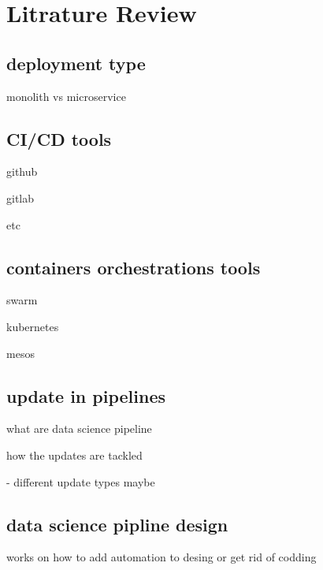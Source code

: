 \section{Litrature Review}
\label{sec:review}
\subsection{deployment type}
monolith vs microservice

\subsection{CI/CD tools}
github

gitlab

etc
\subsection{containers orchestrations tools}
swarm

kubernetes

mesos
\subsection{update in pipelines}
what are data science pipeline

how the updates are tackled

- different update types maybe
\subsection{data science pipline design}
works on how to add automation to desing
or get rid of codding
